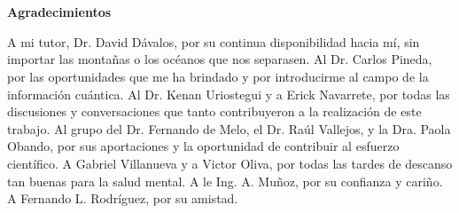 \section*{}
\vspace{6cm}
\textbf{\Large Agradecimientos}
\newline

A mi tutor, Dr. David Dávalos, por su continua disponibilidad hacia mí, sin importar las montañas o los océanos que nos separasen. 
%
Al Dr. Carlos Pineda, por las oportunidades que me ha brindado y por introducirme al campo de la información cuántica.
%
Al Dr. Kenan Uriostegui y a Erick Navarrete, por todas las discusiones y conversaciones que tanto contribuyeron a la realización de este trabajo. 
%
Al grupo del Dr. Fernando de Melo, el Dr. Raúl Vallejos, y la Dra. Paola Obando, por sus aportaciones y la oportunidad de contribuir al esfuerzo científico.
%
A Gabriel Villanueva y a Victor Oliva, por todas las tardes de descanso tan buenas para la salud mental.
%
A le Ing. A. Muñoz, por su confianza y cariño. 
%
A Fernando L. Rodríguez, por su amistad.